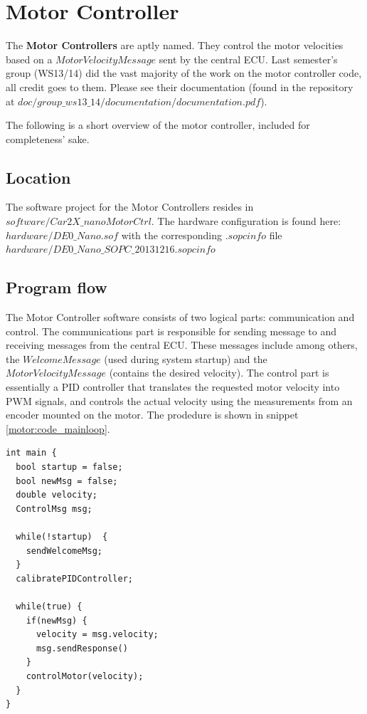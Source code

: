 \section{Motor Controller}
The \textbf{Motor Controllers} are aptly named. They control the motor velocities based on a $MotorVelocityMessage$ sent by the central ECU. Last semester's group (WS13/14) did the vast majority of the work on the motor controller code, all credit goes to them. Please see their documentation (found in the repository at $doc/group\_ws13\_14/documentation/documentation.pdf$). 

The following is a short overview of the motor controller, included for completeness' sake.

\subsection{Location}
The software project for the Motor Controllers resides in $software/ Car2X\_nanoMotorCtrl$. The hardware configuration is found here: $hardware/DE0\_Nano.sof$ with the corresponding $.sopcinfo$ file $hardware/DE0\_Nano\_SOPC\_20131216.sopcinfo$

\subsection{Program flow}
The Motor Controller software consists of two logical parts: communication and control. The communications part is responsible for sending message to and receiving messages from the central ECU. These messages include among others, the $WelcomeMessage$ (used during system startup) and the $MotorVelocityMessage$ (contains the desired velocity). The control part is essentially a PID controller that translates the requested motor velocity into PWM signals, and controls the actual velocity using the measurements from an encoder mounted on the motor. The prodedure is shown in snippet \ref{motor:code_mainloop}.

\begin{lstlisting}[label=motor:code_mainloop,caption={The motor controller program in pseudo-code.}]
int main {
  bool startup = false;
  bool newMsg = false;
  double velocity;
  ControlMsg msg;

  while(!startup)  {
    sendWelcomeMsg;
  }
  calibratePIDController;
  
  while(true) {
    if(newMsg) {
      velocity = msg.velocity;
      msg.sendResponse()
    }
    controlMotor(velocity);
  }
}
\end{lstlisting}

